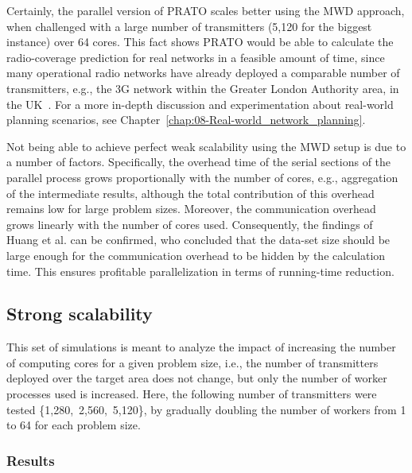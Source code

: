 Certainly, the parallel version of PRATO scales better using the MWD
approach, when challenged with a large number of transmitters (5,120
for the biggest instance) over 64 cores. This fact shows PRATO would
be able to calculate the radio-coverage prediction for real networks
in a feasible amount of time, since many operational radio networks
have already deployed a comparable number of transmitters, e.g., the
3G network within the Greater London Authority area, in the UK~\cite{Number_of_base_stations_in_England}.
For a more in-depth discussion and experimentation about real-world
planning scenarios, see Chapter~\ref{chap:08-Real-world_network_planning}.

Not being able to achieve perfect weak scalability using the MWD setup
is due to a number of factors. Specifically, the overhead time of
the serial sections of the parallel process grows proportionally with
the number of cores, e.g., aggregation of the intermediate results,
although the total contribution of this overhead remains low for large
problem sizes. Moreover, the communication overhead grows linearly
with the number of cores used. Consequently, the findings of Huang
et al. \cite{Huang-Explorations_of_the_implementation_of_a_parallel_IDW_algorithm_in_a_Linux_cluster:2011}
can be confirmed, who concluded that the data-set size should be large
enough for the communication overhead to be hidden by the calculation
time. This ensures profitable parallelization in terms of running-time
reduction.


\subsection{Strong scalability \label{sub:04-Strong_scalability}}

This set of simulations is meant to analyze the impact of increasing
the number of computing cores for a given problem size, i.e., the
number of transmitters deployed over the target area does not change,
but only the number of worker processes used is increased. Here, the
following number of transmitters were tested \{1,280,~2,560,~5,120\},
by gradually doubling the number of workers from 1 to 64 for each
problem size.


\subsubsection*{Results}

